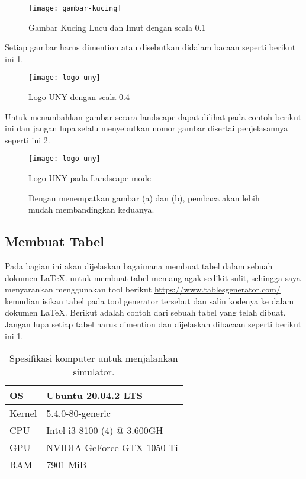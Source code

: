 \begin{figure}[H]
    \centering
    \texttt{[image: gambar-kucing]}
    \caption{Gambar Kucing Lucu dan Imut dengan scala 0.1}
    \label{fig:kucing}
\end{figure}

Setiap gambar harus dimention atau disebutkan didalam bacaan seperti berikut ini \cref{fig:kucing}.

\begin{figure}[H]
    \centering
    \texttt{[image: logo-uny]}
    \caption{Logo UNY dengan scala 0.4}
    \label{fig:logoUNY}
\end{figure}

Untuk menambahkan gambar secara landscape dapat dilihat pada contoh berikut ini dan jangan lupa selalu menyebutkan nomor gambar disertai penjelasannya seperti ini \cref{fig:logoUNY}.

\begin{sidewaysfigure}[htbp]
	\centering
	\texttt{[image: logo-uny]}
	\caption{Logo UNY pada Landscape mode}
    \label{fig:logoUNYlandscape}
\end{sidewaysfigure}

\begin{figure}[H]
    \centering
    \hspace{0.1\linewidth}
    \caption{Dengan menempatkan gambar (a) dan (b), pembaca akan lebih mudah membandingkan keduanya.}
    \label{fig:kucingdanUNY}
\end{figure}

\subsection{Membuat Tabel}
Pada bagian ini akan dijelaskan bagaimana membuat tabel dalam sebuah dokumen \LaTeX. untuk membuat tabel memang agak sedikit sulit, sehingga saya menyarankan menggunakan tool berikut \url{https://www.tablesgenerator.com/} kemudian isikan tabel pada tool generator tersebut dan salin kodenya ke dalam dokumen \LaTeX. Berikut adalah contoh dari sebuah tabel yang telah dibuat. Jangan lupa setiap tabel harus dimention dan dijelaskan dibacaan seperti berikut ini \cref{tab:spekPC}.

\begin{longtable}{|p{2cm}|p{7cm}|}
    \caption{Spesifikasi komputer untuk menjalankan simulator.}
    \label{tab:spekPC} \\
    \hline
    OS     & Ubuntu 20.04.2 LTS             \\ \hline
    Kernel & 5.4.0-80-generic               \\ \hline
    CPU    & Intel i3-8100 (4) @ 3.600GH    \\ \hline
    GPU    & NVIDIA GeForce GTX 1050 Ti     \\ \hline
    RAM    & 7901 MiB                       \\ \hline
\end{longtable}

